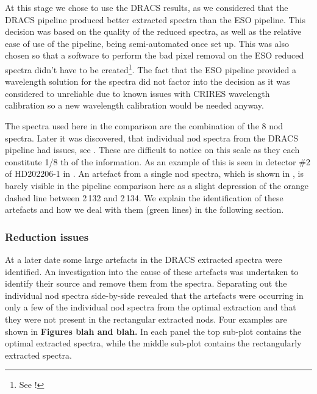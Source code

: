 At this stage we chose to use the {DRACS} results, as we considered that the {DRACS} pipeline produced better extracted spectra than the {ESO} pipeline. This decision was based on the quality of the reduced spectra, as well as the relative ease of use of the pipeline, being semi-automated once set up. This was also chosen so that a software to perform the bad pixel removal on the {ESO} reduced spectra didn't have to be created\footnote{See !}. The fact that the {ESO} pipeline provided a wavelength solution for the spectra did not factor into the decision as it was considered to unreliable due to known issues with {CRIRES} wavelength calibration so a new wavelength calibration would be needed anyway.

The spectra used here in the comparison are the combination of the 8 nod spectra. Later it was discovered, that individual nod spectra from the {DRACS} pipeline had issues, see . These are difficult to notice on this scale as they each constitute 1/8 th of the information. As an example of this is seen in detector \#2 of HD202206-1 in . An artefact from a single nod spectra, which is shown in , is barely visible in the pipeline comparison here as a slight depression of the orange dashed line between 2\,132 and 2\,134\nm{}. We explain the identification of these artefacts and how we deal with them (green lines) in the following section.

\subsubsection{Reduction issues}
\label{subsubsec:reductionartefacts}
At a later date some large artefacts in the {DRACS} extracted spectra were identified. An investigation into the cause of these artefacts was undertaken to identify their source and remove them from the spectra. Separating out the individual nod spectra side-by-side revealed that the artefacts were occurring in only a few of the individual nod spectra from the optimal extraction and that they were not present in the rectangular extracted nods. Four examples are shown in \textbf{Figures blah and blah.} In each panel the top sub-plot contains the optimal extracted spectra, while the middle sub-plot contains the rectangularly extracted spectra.


